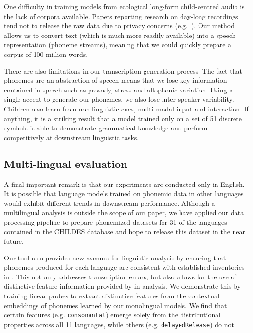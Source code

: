 One difficulty in training models from ecological long-form child-centred audio is the lack of corpora available. Papers reporting research on day-long recordings tend not to release the raw data due to privacy concerns (e.g.\ \citet{bergelson-etal-2023,leon-cristia-2024}).
Our method allows us to convert text (which is much more readily available) into a speech representation (phoneme streams), meaning that we could quickly prepare a corpus of 100 million words. 

There are also limitations in our transcription generation process. The fact that phonemes are an abstraction of speech means that we lose key information contained in speech such as prosody, stress and allophonic variation. Using a single accent to generate our phonemes, we also lose inter-speaker variability. Children also learn from non-linguistic cues, multi-modal input and interaction. If anything, it is a striking result that a model trained only on a set of 51 discrete symbols is able to demonstrate grammatical knowledge and perform competitively at downstream linguistic tasks. 


\subsection{Multi-lingual evaluation}
\label{sec:14-limitations} 

A final important remark is that our experiments are conducted only in English. It is possible that language models trained on phonemic data in other languages would exhibit different trends in downstream performance. Although a multilingual analysis is outside the scope of our paper, we have applied our data processing pipeline to prepare phonemized datasets for 31 of the languages contained in the CHILDES database and hope to release this dataset in the near future.




Our \gpp tool also provides new avenues for linguistic analysis by ensuring that phonemes produced for each language are consistent with established inventories in \phoible. This not only addresses transcription errors, but also allows for the use of distinctive feature information provided by \phoible in analysis. We demonstrate this by training linear probes to extract distinctive features from the contextual embeddings of phonemes learned by our monolingual models. We find that certain features (e.g. \texttt{consonantal}) emerge solely from the distributional properties across all 11 languages, while others (e.g. \texttt{delayedRelease}) do not. 


